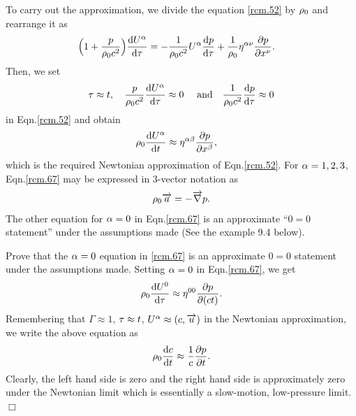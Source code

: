 To carry out the approximation, we divide the equation
\eqref{rcm.52} by ${\rho}_0$ and rearrange it as
\begin{align}\label{rcm.66}
\Big(1+ \frac{p}{\rho_0 c^2}\Big)\frac{\mathrm{d} U^{{\alpha}}}{\mathrm{d} 
{\tau}}&=
-\frac{1}{\rho_0 c^2}U^{{\alpha}} \frac{\mathrm{d} p}{\mathrm{d} {\tau}}
+\frac{1}{\rho_0}
\eta^{{\alpha}{\nu}}\frac{{\partial} p}{{\partial} x^{{\nu}}}.
\end{align}
Then, we set
\begin{align*}
 {\tau}\approx t , \quad \frac{p}{{\rho}_0c^2}\frac{\mathrm{d} 
U^{{\alpha}}}{\mathrm{d} {\tau}}\approx 0\quad \text{ and} \quad 
\frac{1}{\rho_0 c^2}\frac{\mathrm{d} p}{\mathrm{d} {\tau}}\approx 0
\end{align*}
in Eqn.\eqref{rcm.52} and obtain
\begin{align}\label{rcm.67}
\rho_0\frac{\mathrm{d} U^{{\alpha}}}{\mathrm{d} t}&\approx
\eta^{{\alpha}{\beta}}\frac{{\partial} p}{{\partial} x^{{\beta}}},
\end{align}
which is the required Newtonian approximation of  
Eqn.\eqref{rcm.52}. For ${\alpha}=1,2,3$, Eqn.\eqref{rcm.67} 
may 
be expressed in 3-vector notation as
\begin{align}\label{rcm.68}
  \rho_0 \overrightarrow{a} =-{\overrightarrow{\nabla} } p.
\end{align}
The other equation for ${\alpha}=0$ in Eqn.\eqref{rcm.67} is 
an  approximate ``$0=0$ statement'' under the 
assumptions made (See the example 9.4 below).

\exmnp Prove that the ${\alpha}=0$ equation in  \eqref{rcm.67}
is an approximate $0=0$ statement under the assumptions 
made.
\soln Setting ${\alpha}=0$ in  Eqn.\eqref{rcm.67}, we get
\begin{align*}
 {\rho}_0\frac{\mathrm{d} U^0}{\mathrm{d} {\tau}}\approx{\eta}^{00}
 \frac{{\partial} p}{{\partial} (ct)}.
\end{align*}
Remembering that $\Gamma \approx 1$,  ${\tau}\approx t$, 
$U^{{\alpha}}\approx (c, \overrightarrow{u})$ in the Newtonian 
approximation, we write the above equation as
\begin{align*}
 {\rho}_0\frac{\mathrm{d} c}{\mathrm{d} t}\approx\frac{1}{c}\frac{{\partial} 
p}{{\partial} t}.
\end{align*}
Clearly, the left hand side is zero and the right hand 
side is approximately zero under the Newtonian limit 
which is essentially a slow-motion, low-pressure limit. 
\\ \dm \hfill $\Box$


